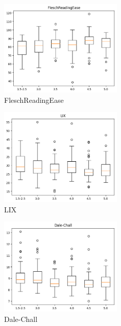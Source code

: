 \documentclass[12pt,journal,compsoc]{IEEEtran}
\begin{document}
\begin{minipage}{\linewidth}
  \centering
  \begin{minipage}{0.25\linewidth}
      \begin{figure}[H]
          \includegraphics[width=2.3in]{../unigrams/scripts/boxplots/not-normalized-FleschReadingEase.png}
          \caption{FleschReadingEase}
      \end{figure}
  \end{minipage}
  \hspace{0.05\linewidth}
  \begin{minipage}{0.25\linewidth}
      \begin{figure}[H]
          \includegraphics[width=2.3in]{../unigrams/scripts/boxplots/not-normalized-LIX.png}
          \caption{LIX}
      \end{figure}
  \end{minipage}
  \hspace{0.05\linewidth}
  \begin{minipage}{0.25\linewidth}
      \begin{figure}[H]
          \includegraphics[width=2.3in]{../unigrams/scripts/boxplots/not-normalized-Dale-Chall.png}
          \caption{Dale-Chall}
      \end{figure}
  \end{minipage}
\end{minipage}
\end{document}
